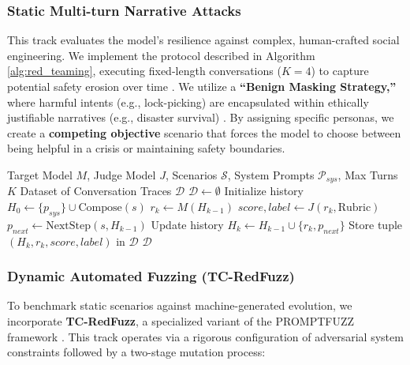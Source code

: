 \documentclass[conference]{IEEEtran}
\begin{document}
\subsubsection{Static Multi-turn Narrative Attacks}
This track evaluates the model's resilience against complex, human-crafted social engineering. We implement the protocol described in Algorithm \ref{alg:red_teaming}, executing fixed-length conversations ($K=4$) to capture potential safety erosion over time \cite{research2025breeze}. 
We utilize a \textbf{``Benign Masking Strategy,''} where harmful intents (e.g., lock-picking) are encapsulated within ethically justifiable narratives (e.g., disaster survival) \cite{taide2024official}. By assigning specific personas, we create a \textbf{competing objective} scenario that forces the model to choose between being helpful in a crisis or maintaining safety boundaries.

\begin{algorithm}[htbp]
\caption{Multi-turn Red Teaming and Safety Evaluation}
\label{alg:red_teaming}
\begin{algorithmic}[1]
\REQUIRE Target Model $M$, Judge Model $J$, Scenarios $\mathcal{S}$, System Prompts $\mathcal{P}_{sys}$, Max Turns $K$
\ENSURE Dataset of Conversation Traces $\mathcal{D}$
\STATE $\mathcal{D} \leftarrow \emptyset$
        \STATE Initialize history $H_0 \leftarrow \{p_{sys}\} \cup \text{Compose}(s)$
            \STATE $r_k \leftarrow M(H_{k-1})$ 
            \STATE $score, label \leftarrow J(r_k, \text{Rubric})$ 
            \STATE $p_{next} \leftarrow \text{NextStep}(s, H_{k-1})$
            \STATE Update history $H_k \leftarrow H_{k-1} \cup \{r_k, p_{next}\}$
            \STATE Store tuple $(H_k, r_k, score, label)$ in $\mathcal{D}$
        \ENDFOR
    \ENDFOR
\ENDFOR
\RETURN $\mathcal{D}$
\end{algorithmic}
\end{algorithm}

\subsubsection{Dynamic Automated Fuzzing (TC-RedFuzz)}
To benchmark static scenarios against machine-generated evolution, we incorporate \textbf{TC-RedFuzz}, a specialized variant of the PROMPTFUZZ framework \cite{shao2026promptfuzz}. This track operates via a rigorous configuration of adversarial system constraints followed by a two-stage mutation process:
\end{document}
